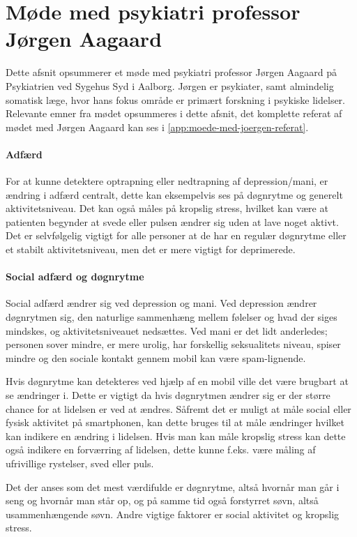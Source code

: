 \section{Møde med psykiatri professor Jørgen Aagaard}\label{sec:moede-med-joergen}
Dette afsnit opsummerer et møde med psykiatri professor Jørgen Aagaard på Psykiatrien ved Sygehus Syd i Aalborg. 
Jørgen er psykiater, samt almindelig somatisk læge, hvor hans fokus område er primært forskning i psykiske lidelser.
Relevante emner fra mødet opsummeres i dette afsnit, det komplette referat af mødet med Jørgen Aagaard kan ses i \cref{app:moede-med-joergen-referat}.

\paragraph{Adfærd}
For at kunne detektere optrapning eller nedtrapning af depression/mani, er ændring i adfærd centralt, dette kan eksempelvis ses på døgnrytme og generelt aktivitetsniveau. 
Det kan også måles på kropslig stress, hvilket kan være at patienten begynder at svede eller pulsen ændrer sig uden at lave noget aktivt. 
Det er selvfølgelig vigtigt for alle personer at de har en regulær døgnrytme eller et stabilt aktivitetsniveau, men det er mere vigtigt for deprimerede.

\paragraph{Social adfærd og døgnrytme}
Social adfærd ændrer sig ved depression og mani.
Ved depression ændrer døgnrytmen sig, den naturlige sammenhæng mellem følelser og hvad der siges mindskes, og aktivitetsniveauet nedsættes.
Ved mani er det lidt anderledes; personen sover mindre, er mere urolig, har forskellig seksualitets niveau, spiser mindre og den sociale kontakt gennem mobil kan være spam-lignende. 

Hvis døgnrytme kan detekteres ved hjælp af en mobil ville det være brugbart at se ændringer i.
Dette er vigtigt da hvis døgnrytmen ændrer sig er der større chance for at lidelsen er ved at ændres.
Såfremt det er muligt at måle social eller fysisk aktivitet på smartphonen, kan dette bruges til at måle ændringer hvilket kan indikere en ændring i lidelsen.
Hvis man kan måle kropslig stress kan dette også indikere en forværring af lidelsen, dette kunne f.eks. være måling af ufrivillige rystelser, sved eller puls. 

Det der anses som det mest værdifulde er døgnrytme, altså hvornår man går i seng og hvornår man står op, og på samme tid også forstyrret søvn, altså usammenhængende søvn. 
Andre vigtige faktorer er social aktivitet og kropslig stress.

